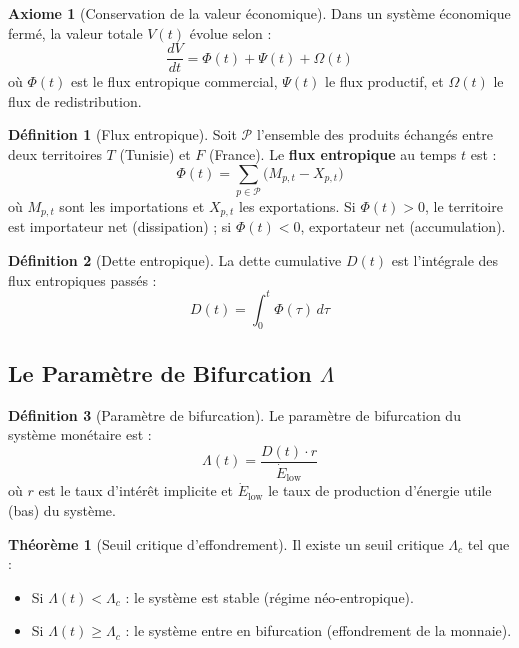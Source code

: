 \documentclass[11pt,a4paper]{article}
\theoremstyle{definition}
\newtheorem{definition}{Définition}[section]
\newtheorem{theorem}{Théorème}[section]
\newtheorem{axiom}{Axiome}[section]
\theoremstyle{remark}
\begin{document}
\begin{axiom}[Conservation de la valeur économique]
\label{ax:conservation}
Dans un système économique fermé, la valeur totale $V(t)$ évolue selon :
\begin{equation}
    \frac{dV}{dt} = \Phi(t) + \Psi(t) + \Omega(t)
\end{equation}
où $\Phi(t)$ est le flux entropique commercial, $\Psi(t)$ le flux productif, et $\Omega(t)$ le flux de redistribution.
\end{axiom}

\begin{definition}[Flux entropique]
\label{def:flux_entropique}
Soit $\mathcal{P}$ l'ensemble des produits échangés entre deux territoires $T$ (Tunisie) et $F$ (France). Le \textbf{flux entropique} au temps $t$ est :
\begin{equation}
    \boxed{\Phi(t) = \sum_{p \in \mathcal{P}} \big( M_{p,t} - X_{p,t} \big)}
\end{equation}
où $M_{p,t}$ sont les importations et $X_{p,t}$ les exportations. Si $\Phi(t) > 0$, le territoire est importateur net (dissipation) ; si $\Phi(t) < 0$, exportateur net (accumulation).
\end{definition}

\begin{definition}[Dette entropique]
\label{def:dette_entropique}
La dette cumulative $D(t)$ est l'intégrale des flux entropiques passés :
\begin{equation}
    D(t) = \int_0^t \Phi(\tau) \, d\tau
\end{equation}
\end{definition}

\subsection{Le Paramètre de Bifurcation $\Lambda$}

\begin{definition}[Paramètre de bifurcation]
\label{def:lambda}
Le paramètre de bifurcation du système monétaire est :
\begin{equation}
    \boxed{\Lambda(t) = \frac{D(t) \cdot r}{\dot{E}_{\text{low}}}}
\end{equation}
où $r$ est le taux d'intérêt implicite et $\dot{E}_{\text{low}}$ le taux de production d'énergie utile (bas) du système.
\end{definition}

\begin{theorem}[Seuil critique d'effondrement]
\label{th:seuil}
Il existe un seuil critique $\Lambda_c$ tel que :
\begin{itemize}
    \item Si $\Lambda(t) < \Lambda_c$ : le système est stable (régime néo-entropique).
    \item Si $\Lambda(t) \geq \Lambda_c$ : le système entre en bifurcation (effondrement de la monnaie).
\end{itemize}
\end{theorem}
\end{document}
